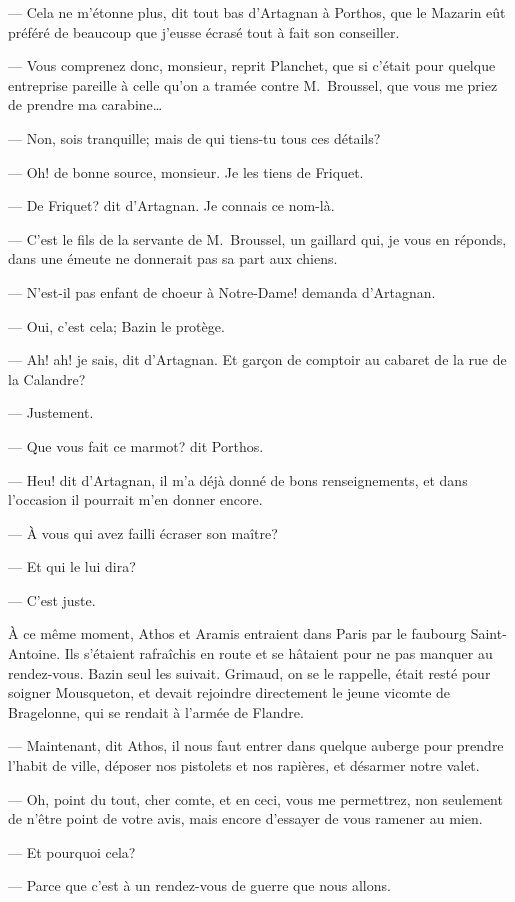 — Cela ne m'étonne plus, dit tout bas d'Artagnan à Porthos, que le Mazarin eût préféré de beaucoup que j'eusse écrasé tout à fait son conseiller.

— Vous comprenez donc, monsieur, reprit Planchet, que si c'était pour quelque entreprise pareille à celle qu'on a tramée contre M.~Broussel, que vous me priez de prendre ma carabine\dots

— Non, sois tranquille; mais de qui tiens-tu tous ces détails?

— Oh! de bonne source, monsieur. Je les tiens de Friquet.

— De Friquet? dit d'Artagnan. Je connais ce nom-là.

— C'est le fils de la servante de M.~Broussel, un gaillard qui, je vous en réponds, dans une émeute ne donnerait pas sa part aux chiens.

— N'est-il pas enfant de choeur à Notre-Dame! demanda d'Artagnan.

— Oui, c'est cela; Bazin le protège.

— Ah! ah! je sais, dit d'Artagnan. Et garçon de comptoir au cabaret de la rue de la Calandre?

— Justement.

— Que vous fait ce marmot? dit Porthos.

— Heu! dit d'Artagnan, il m'a déjà donné de bons renseignements, et dans l'occasion il pourrait m'en donner encore.

— À vous qui avez failli écraser son maître?

— Et qui le lui dira?

— C'est juste.

À ce même moment, Athos et Aramis entraient dans Paris par le faubourg Saint-Antoine. Ils s'étaient rafraîchis en route et se hâtaient pour ne pas manquer au rendez-vous. Bazin seul les suivait. Grimaud, on se le rappelle, était resté pour soigner Mousqueton, et devait rejoindre directement le jeune vicomte de Bragelonne, qui se rendait à l'armée de Flandre.

— Maintenant, dit Athos, il nous faut entrer dans quelque auberge pour prendre l'habit de ville, déposer nos pistolets et nos rapières, et désarmer notre valet.

— Oh, point du tout, cher comte, et en ceci, vous me permettrez, non seulement de n'être point de votre avis, mais encore d'essayer de vous ramener au mien.

— Et pourquoi cela?

— Parce que c'est à un rendez-vous de guerre que nous allons.

